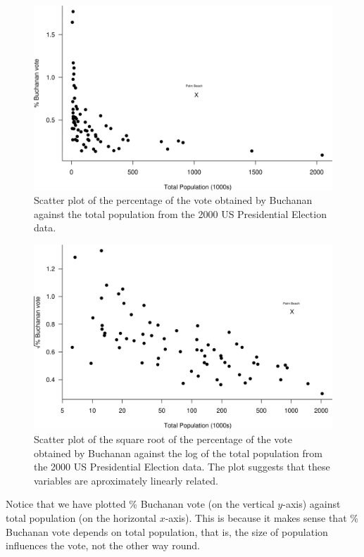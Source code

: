 \documentclass[
  british,
]{book}
\begin{document}
\begin{figure}

{\centering \includegraphics[width=0.8\linewidth]{images/election_scatter1a} 

}

\caption{Scatter plot of the percentage of the vote obtained by Buchanan against the total population from the 2000 US Presidential Election data.}\label{fig:scatter1a}
\end{figure}
\FloatBarrier

\begin{figure}

{\centering \includegraphics[width=0.8\linewidth]{images/election_scatter1b} 

}

\caption{Scatter plot of the square root of the percentage of the vote obtained by Buchanan against the log of the total population from the 2000 US Presidential Election data.  The plot suggests that these variables are aproximately linearly related.}\label{fig:scatter1b}
\end{figure}
\FloatBarrier

Notice that we have plotted \% Buchanan vote (on the vertical \(y\)-axis) against total population (on the horizontal \(x\)-axis). This is because it makes sense that \% Buchanan vote depends on total population, that is, the size of population influences the vote, not the other way round.
\end{document}
